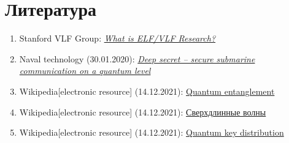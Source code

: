 \documentclass[a4paper,12pt]{article} %
\begin{document}
\section*{Литература}
\begin{enumerate}
\item Stanford VLF Group: \href{https://vlfstanford.ku.edu.tr/research_topic_inlin/introduction-vlf/}{\it What is ELF/VLF Research?}
\item Naval technology (30.01.2020): \href{https://www.naval-technology.com/features/featuredeep-secret-secure-submarine-communication-on-a-quantum-level/?utm_source=Army%20Technology&utm_medium=website&utm_campaign=Must%20Read&utm_content=Image}{\it Deep secret – secure submarine communication on a quantum level}
\item Wikipedia[electronic resource] (14.12.2021): \href{https://en.wikipedia.org/wiki/Quantum_entanglement}{Quantum entanglement}
\item Wikipedia[electronic resource] (14.12.2021): \href{https://ru.wikipedia.org/wiki/%D0%A1%D0%B2%D0%B5%D1%80%D1%85%D0%B4%D0%BB%D0%B8%D0%BD%D0%BD%D1%8B%D0%B5_%D0%B2%D0%BE%D0%BB%D0%BD%D1%8B}{Сверхдлинные волны}
\item Wikipedia[electronic resource] (14.12.2021): \href{https://en.wikipedia.org/wiki/Quantum_key_distribution}{Quantum key distribution}
\end{enumerate}
\end{document}

